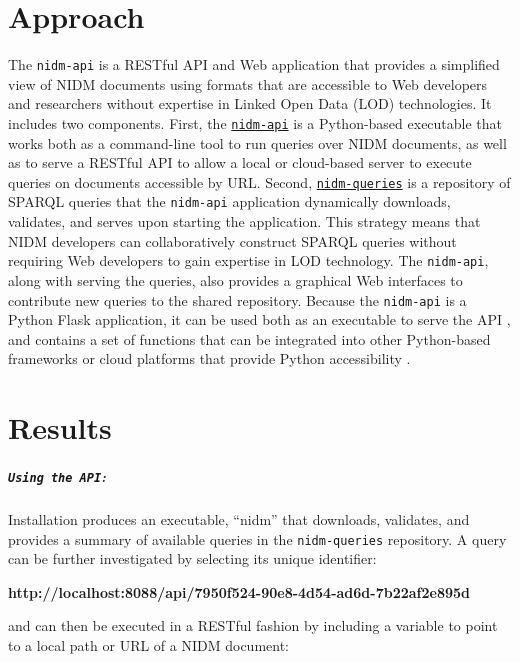 \documentclass[twocolumn]{bmcart}%
\begin{document}
\section{Approach}\label{approach}
The \texttt{nidm-api} \cite{noauthor_undated-hq} is a RESTful API and Web application that provides a simplified view of NIDM documents using formats that are accessible to Web developers and researchers without expertise in Linked Open Data (LOD) technologies. It includes two components. First, the \href{https://github.com/incf-nidash/nidm-api}{\texttt{nidm-api}} is a Python-based executable that works both as a command-line tool to run queries over NIDM documents, as well as to serve a RESTful API to allow a local or cloud-based server to execute queries on documents accessible by URL. Second, \href{https://github.com/incf-nidash/nidm-queries}{\texttt{nidm-queries}} is a repository of SPARQL queries that the \texttt{nidm-api} application dynamically downloads, validates, and serves upon starting the application. This strategy means that NIDM developers can collaboratively construct SPARQL queries without requiring Web developers to gain expertise in LOD technology. The \texttt{nidm-api}, along with serving the queries, also provides a graphical Web interfaces to contribute new queries to the shared repository. Because the \texttt{nidm-api} is a Python Flask \cite{noauthor_undated-ia} application, it can be used both as an executable to serve the API \cite{noauthor_undated-ii}, and contains a set of functions that can be integrated into other Python-based frameworks \cite{noauthor_undated-ej} or cloud platforms that provide Python accessibility \cite{noauthor_undated-jw,Google_undated-aj}. 

\section{Results}\label{results}
\subparagraph{\texorpdfstring{\texttt{Using the API}:}{:}}\label{section}
Installation produces an executable, “nidm” that downloads, validates, and provides a summary of available queries in the \texttt{nidm-queries} repository. A query can be further investigated by selecting its unique identifier: \newline

\textbf{http://localhost:8088/api/7950f524-90e8-4d54-ad6d-7b22af2e895d}\newline

and can then be executed in a RESTful fashion by including a variable to point to a local path or URL of a NIDM document:\newline
\end{document}
